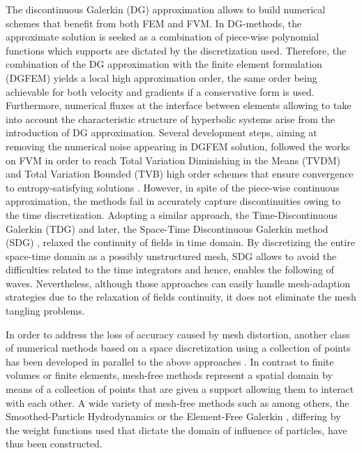 The discontinuous Galerkin (DG) approximation \cite{NeutronDG} allows to build numerical schemes that benefit from both FEM and FVM.
In DG-methods, the approximate solution is seeked as a combination of piece-wise polynomial functions which supports are dictated by the discretization used.
Therefore, the combination of the DG approximation with the finite element formulation (DGFEM) yields a local high approximation order, the same order being achievable for both velocity and gradients if a conservative form is used.
Furthermore, numerical fluxes at the interface between elements allowing to take into account the characteristic structure of hyperbolic systems arise from the introduction of DG approximation.
Several development steps, aiming at removing the numerical noise appearing in DGFEM solution, followed the works on FVM in order to reach Total Variation Diminishing in the Means (TVDM) and Total Variation Bounded (TVB) high order schemes that ensure convergence to entropy-satisfying solutions \cite{Cockburn}.
However, in spite of the piece-wise continuous approximation, the methods fail in accurately capture discontinuities owing to the time discretization.
Adopting a similar approach, the Time-Discontinuous Galerkin (TDG) \cite{Hughes_TDG} and later, the Space-Time Discontinuous Galerkin method (SDG) \cite{ST_DGFEM1}, relaxed the continuity of fields in time domain. 
By discretizing the entire space-time domain as a possibly unstructured mesh, SDG allows to avoid the difficulties related to the time integrators and hence, enables the following of waves.
Nevertheless, although those approaches can easily handle mesh-adaption strategies due to the relaxation of fields continuity, it does not eliminate the mesh tangling problems.

In order to address the loss of accuracy caused by mesh distortion, another class of numerical methods based on a space discretization using a collection of points has been developed in parallel to the above approaches \cite{Belytschko_Meshless,Meshless}.
In contrast to finite volumes or finite elements, mesh-free methods represent a spatial domain by means of a collection of points that are given a support allowing them to interact with each other.
A wide variety of mesh-free methods such as among others, the Smoothed-Particle Hydrodynamics \cite{SPH} or the Element-Free Galerkin \cite{Belytschko_EFG}, differing by the weight functions used that dictate the domain of influence of particles, have thus been constructed.

